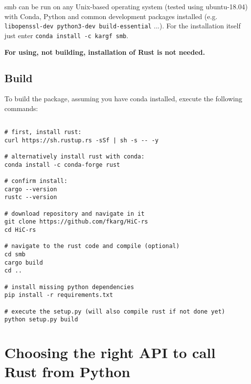 
smb can be run on any Unix-based operating system (tested using ubuntu-18.04)
with Conda, Python and common development packages installed (e.g.
\verb!libopenssl-dev python3-dev build-essential! ...). For the installation
itself just enter \verb|conda install -c kargf smb|.

\textbf{For using, not building, installation of Rust is not needed.}


\subsection{Build}\label{sec:build}

To build the package, assuming you have conda installed, execute the following
commands:

\begin{verbatim}

# first, install rust:
curl https://sh.rustup.rs -sSf | sh -s -- -y

# alternatively install rust with conda:
conda install -c conda-forge rust

# confirm install:
cargo --version
rustc --version

# download repository and navigate in it
git clone https://github.com/fkarg/HiC-rs
cd HiC-rs

# navigate to the rust code and compile (optional)
cd smb
cargo build
cd ..

# install missing python dependencies
pip install -r requirements.txt

# execute the setup.py (will also compile rust if not done yet)
python setup.py build

\end{verbatim}










\section{Choosing the right API to call Rust from Python}\label{sec:api}

